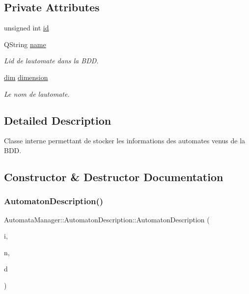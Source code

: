 \subsection*{Private Attributes}
\begin{DoxyCompactItemize}
\item 
unsigned int \mbox{\hyperlink{class_automata_manager_1_1_automaton_description_a49ea94482dc533e49506a4b50f23c404}{id}}
\item 
Q\+String \mbox{\hyperlink{class_automata_manager_1_1_automaton_description_a5a10b5598482bcf7e3c8f871a3e16dad}{name}}
\begin{DoxyCompactList}\small\item\em L\textquotesingle{}id de l\textquotesingle{}automate dans la B\+DD. \end{DoxyCompactList}\item 
\mbox{\hyperlink{automatamanager_8h_ae6fa959b9e8f9c638e0d82bf2c7dc5e7}{dim}} \mbox{\hyperlink{class_automata_manager_1_1_automaton_description_a1791ce5195bafc49fe4d4df74b25c82d}{dimension}}
\begin{DoxyCompactList}\small\item\em Le nom de l\textquotesingle{}automate. \end{DoxyCompactList}\end{DoxyCompactItemize}


\subsection{Detailed Description}
Classe interne permettant de stocker les informations des automates venus de la B\+DD. 

\subsection{Constructor \& Destructor Documentation}
\mbox{\label{class_automata_manager_1_1_automaton_description_a48061cac5f3504b783a9949dfab6fefa}} 
\subsubsection{\texorpdfstring{Automaton\+Description()}{AutomatonDescription()}}
{\footnotesize\ttfamily Automata\+Manager\+::\+Automaton\+Description\+::\+Automaton\+Description (\begin{DoxyParamCaption}\item[{unsigned int}]{i,  }\item[{Q\+String}]{n,  }\item[{\mbox{\hyperlink{automatamanager_8h_ae6fa959b9e8f9c638e0d82bf2c7dc5e7}{dim}}}]{d }\end{DoxyParamCaption})}



